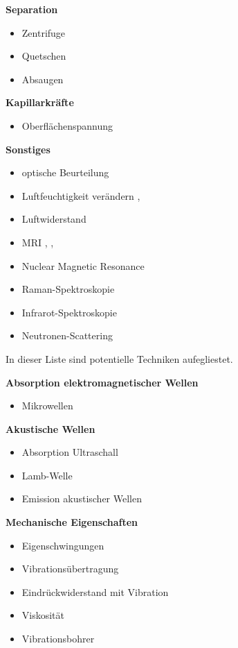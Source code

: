 \textbf{Separation}
\begin{itemize}
\item Zentrifuge
\item Quetschen
\item Absaugen
\end{itemize}

\textbf{Kapillarkräfte}
\begin{itemize}

\item Oberflächenspannung \cite{AlamShibly.2017}
\end{itemize}

\textbf{Sonstiges}
\begin{itemize}
\item optische Beurteilung \cite{miro}
\item Luftfeuchtigkeit verändern \cite{joule-thomson-wiki}, \cite{sensirion-sht4xa-sensors}
\item Luftwiderstand
\item MRI \cite{Adachi.2020}, \cite{Nowogrodzki.2018}, \cite{Yamaguchi.2023}
\item Nuclear Magnetic Resonance
\item Raman-Spektroskopie \cite{Reichardt.2022}
\item Infrarot-Spektroskopie
\item Neutronen-Scattering \cite{Lombardo.2023}
\end{itemize}

In dieser Liste sind potentielle Techniken aufegliestet.

\textbf{Absorption elektromagnetischer Wellen}
\begin{itemize}

\item Mikrowellen
\end{itemize}



\textbf{Akustische Wellen}
\begin{itemize}
\item Absorption Ultraschall
\item Lamb-Welle \cite{lamb}
\item Emission akustischer Wellen
\end{itemize}


\textbf{Mechanische Eigenschaften}
\begin{itemize}
\item Eigenschwingungen
\item Vibrationsübertragung
\item Eindrückwiderstand mit Vibration
\item Viskosität
\item Vibrationsbohrer
\end{itemize}


